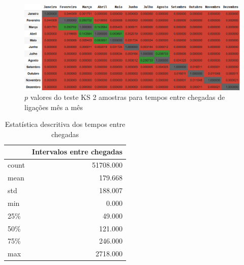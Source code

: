 \begin{figure}[H]
    \includegraphics[scale=0.6]{analise-de-dados/anual/ks-arrivals.png}
    \caption{$p$ valores do teste KS 2 amostras para tempos entre chegadas de ligações mês a mês}
    \label{fig: ks-arrivals}
\end{figure}

\begin{table}[H]
    \centering
    \begin{tabular}{lr}
            \toprule
            {} &  Intervalos entre chegadas \\
            \midrule
            count &   51708.000  \\
            mean  &      179.668  \\
            std   &      188.007  \\
            min   &       0.000  \\
            25\%   &       49.000  \\
            50\%   &       121.000  \\
            75\%   &       246.000  \\
            max   &     2718.000  \\
        \bottomrule
        \end{tabular}
    \caption{Estatística descritiva dos tempos entre chegadas}
    \label{tab: descricao-arrivals}
\end{table}

